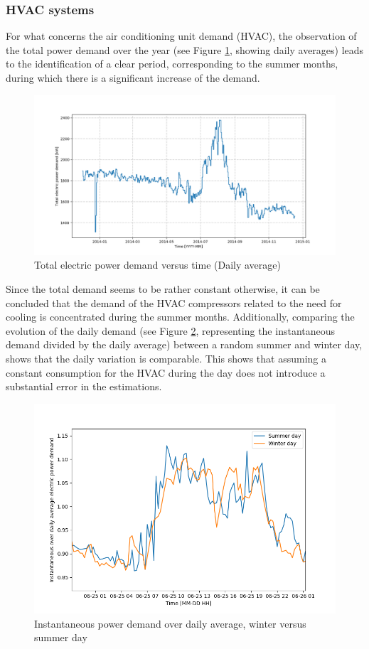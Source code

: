 \documentclass[preprint,12pt]{elsarticle}
\begin{document}
\subsubsection{HVAC systems}

For what concerns the air conditioning unit demand (HVAC), the observation of the total power demand over the year (see Figure \ref{fig:pelvstime}, showing daily averages) leads to the identification of a clear period, corresponding to the summer months, during which there is a significant increase of the demand. 

\begin{figure}
	\centering
	\includegraphics[width=0.9\linewidth]{Figures/Pel_vs_time}
	\caption[Total electric power demand versus time (Daily average)]{Total electric power demand versus time (Daily average)}
	\label{fig:pelvstime}
\end{figure}

Since the total demand seems to be rather constant otherwise, it can be concluded that the demand of the HVAC compressors related to the need for cooling is concentrated during the summer months. Additionally, comparing the evolution of the daily demand (see Figure \ref{fig:pelrelvstime}, representing the instantaneous demand divided by the daily average) between a random summer and winter day, shows that the daily variation is comparable. This shows that assuming a constant consumption for the HVAC during the day does not introduce a substantial error in the estimations.

\begin{figure}
	\centering
	\includegraphics[width=0.9\linewidth]{Figures/PelRel_vs_time}
	\caption{Instantaneous power demand over daily average, winter versus summer day}
	\label{fig:pelrelvstime}
\end{figure}
\end{document}
